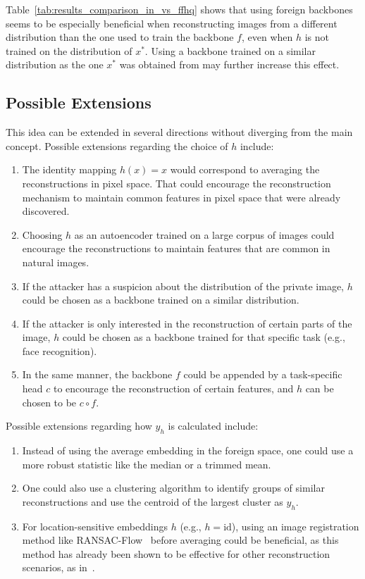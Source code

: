 \documentclass[10pt,twocolumn]{article}
\begin{document}
Table~\ref{tab:results_comparison_in_vs_ffhq} shows that using foreign backbones seems to be especially beneficial when reconstructing images from a different distribution than the one used to train the backbone $f$, even when $h$ is not trained on the distribution of $x^*$.
Using a backbone trained on a similar distribution as the one $x^*$ was obtained from may further increase this effect.

\subsection{Possible Extensions}

This idea can be extended in several directions without diverging from the main concept.
Possible extensions regarding the choice of $h$ include:
\begin{enumerate}
    \item The identity mapping $h(x) = x$ would correspond to averaging the reconstructions in pixel space.
    That could encourage the reconstruction mechanism to maintain common features in pixel space that were already discovered.
    \item Choosing $h$ as an autoencoder trained on a large corpus of images could encourage the reconstructions to maintain features that are common in natural images.
    \item If the attacker has a suspicion about the distribution of the private image, $h$ could be chosen as a backbone trained on a similar distribution.
    \item If the attacker is only interested in the reconstruction of certain parts of the image, $h$ could be chosen as a backbone trained for that specific task (e.g., face recognition).
    \item In the same manner, the backbone $f$ could be appended by a task-specific head $c$ to encourage the reconstruction of certain features, and $h$ can be chosen to be $c \circ f$.
\end{enumerate}
Possible extensions regarding how $y_h$ is calculated include:
\begin{enumerate}
    \item Instead of using the average embedding in the foreign space, one could use a more robust statistic like the median or a trimmed mean.
    \item One could also use a clustering algorithm to identify groups of similar reconstructions and use the centroid of the largest cluster as $y_h$.
    \item For location-sensitive embeddings $h$ (e.g., $h=\text{id}$), using an image registration method like RANSAC-Flow~\cite{shenRANSACFlowGenericTwoStage2020} before averaging could be beneficial, as this method has already been shown to be effective for other reconstruction scenarios, as in~\cite{yinSeeGradientsImage2021}.
\end{enumerate}
\end{document}
